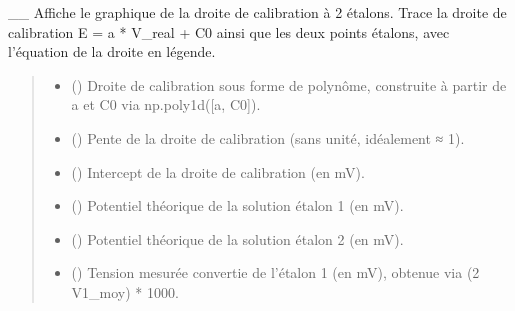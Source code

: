 \documentclass[letterpaper,10pt,english]{sphinxmanual}
\begin{document}
\begin{fulllineitems}
\label{\detokenize{test:test.graphe_cal2}}
\pysigstartsignatures
\pysiglinewithargsret
{}
{\sphinxparamcomma {}\sphinxparamcomma {}\sphinxparamcomma {}\sphinxparamcomma {}\sphinxparamcomma {}\sphinxparamcomma {}}
{}
\pysigstopsignatures
\sphinxAtStartPar
\_\_
Affiche le graphique de la droite de calibration à 2 étalons.
Trace la droite de calibration E = a * V\_real + C0 ainsi que les deux points
étalons, avec l’équation de la droite en légende.
\begin{quote}\begin{description}
\begin{itemize}
\item {} 
\sphinxAtStartPar
{} () \textendash{} Droite de calibration sous forme de polynôme,
construite à partir de a et C0 via np.poly1d({[}a, C0{]}).

\item {} 
\sphinxAtStartPar
{} () \textendash{} Pente de la droite de calibration (sans unité, idéalement ≈ 1).

\item {} 
\sphinxAtStartPar
{} () \textendash{} Intercept de la droite de calibration (en mV).

\item {} 
\sphinxAtStartPar
{} () \textendash{} Potentiel théorique de la solution étalon 1 (en mV).

\item {} 
\sphinxAtStartPar
{} () \textendash{} Potentiel théorique de la solution étalon 2 (en mV).

\item {} 
\sphinxAtStartPar
{} () \textendash{} Tension mesurée convertie de l’étalon 1 (en mV),
obtenue via (2 \sphinxhyphen{} V1\_moy) * 1000.


\end{itemize}
\end{description}
\end{quote}
\end{fulllineitems}
\end{document}
